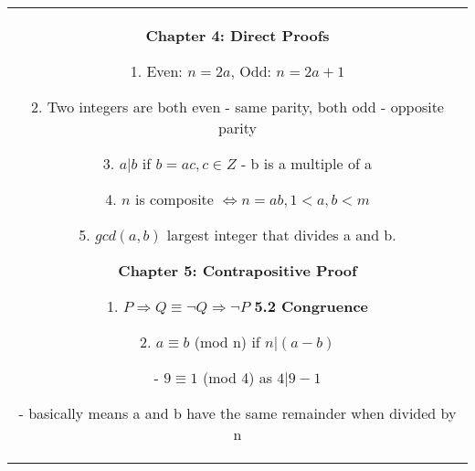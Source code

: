 \documentclass[a4paper]{article}
\begin{document}
\begin{tabular}{@{}c@{}}
\begin{minipage}[t][\paperheight][t]{0.49\paperwidth}
        \textbf{Chapter 4: Direct Proofs}

        1. Even: $n = 2a$, Odd:  $n = 2a + 1$

        2. Two integers are both even - same parity, both odd - opposite parity

        3. $a | b$ if  $b = ac, c \in Z$ - b is a multiple of a

        4.  $n$ is composite $\iff n = ab, 1 <a,b<m$ 

        5. $gcd(a,b)$ largest integer that divides a and b. 


        \textbf{Chapter 5: Contrapositive Proof}


        1. $P \Rightarrow Q \equiv \neg Q \Rightarrow \neg P$ 
        \textbf{5.2 Congruence}

        2. $a \equiv b$ (mod n)  if  $n | (a - b)$ 

        \quad - $9 \equiv 1$ (mod 4) as $4 | 9 - 1$

        \quad - basically means a and b have the same remainder when divided by n







    \end{minipage}%
    \end{tabular}%
\end{document}
